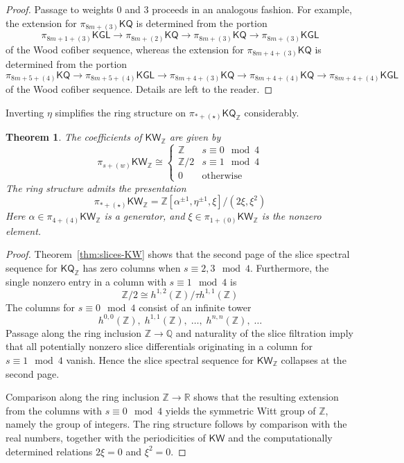 \documentclass[11pt,hyp,english]{article}
\newcommand{\Z}{\mathbb{Z}}
\newcommand{\Q}{\mathbb{Q}}
\newcommand{\KGL}{\mathsf{KGL}}
\newcommand{\KQ}{\mathsf{KQ}}
\newcommand{\KW}{\mathsf{KW}}
\newcommand{\R}{\mathbb{R}}
\newcommand{\bideg}{(\star)}
\newtheorem{theorem}{Theorem}[section]
\theoremstyle{definition}
\begin{document}
\begin{proof}
Passage to weights $0$ and $3$ proceeds in an analogous fashion.  
For example, the extension for $\pi_{8m+(3)}\KQ$ is determined from the portion
\[
  \pi_{8m+1+(3)}\KGL \to \pi_{8m+(2)}\KQ \to \pi_{8m+(3)}\KQ \to \pi_{8m+(3)}\KGL
\]
of the Wood cofiber sequence, whereas the extension for $\pi_{8m+4+(3)}\KQ$ is determined from the portion
\[
  \pi_{8m+5+(4)}\KQ \to \pi_{8m+5+(4)}\KGL \to \pi_{8m+4+(3)}\KQ \to \pi_{8m+4+(4)}\KQ \to \pi_{8m+4+(4)}\KGL
\]
of the Wood cofiber sequence.  
Details are left to the reader.
\end{proof}
    
Inverting $\eta$ simplifies the ring structure on $\pi_{\ast+\bideg}\KQ_\Z$ considerably.

\begin{theorem}\label{thm:coeff-KW}
The coefficients of $\KW_\Z$ are given by 
\[
  \pi_{s+(w)}\KW_\Z \cong
  \begin{cases} 
    \Z & s \equiv 0 \mod{4} \\ 
    \Z/2 & s \equiv 1 \mod{4} \\ 
    0 & \text{otherwise} 
  \end{cases}
\]
The ring structure admits the presentation
\[
  \pi_{\ast+\bideg}\KW_\Z = \Z[\alpha^{\pm 1}, \eta^{\pm 1}, \xi]/(2\xi,\xi^2)
\]
Here $\alpha \in \pi_{4+(4)}\KW_\Z$ is a generator, and $\xi \in \pi_{1+(0)}\KW_\Z$ is the nonzero element.
\end{theorem}

\begin{proof}
Theorem~\ref{thm:slices-KW} shows that the second page of the slice spectral sequence for $\KQ_\Z$ has zero columns when $s \equiv 2,3 \mod{4}$.  
Furthermore, the single nonzero entry in a column with $s \equiv 1 \mod{4}$ is
\[
  \Z/2 \cong h^{1,2}(\Z) / \tau h^{1,1}(\Z)
\]
The columns for $s \equiv 0 \mod{4}$ consist of an infinite tower 
\[
  h^{0,0}(\Z), \; h^{1,1}(\Z), \; \dotsc, \; h^{n,n}(\Z), \; \dotsc
\]
Passage along the ring inclusion $\Z \to \Q$ and naturality of the slice filtration imply that all potentially nonzero slice differentials originating in a column for $s \equiv 1 \mod{4}$ vanish.  
Hence the slice spectral sequence for $\KW_\Z$ collapses at the second page.  

Comparison along the ring inclusion $\Z \to \R$ shows that the resulting extension from the columns with $s \equiv 0 \mod{4}$ yields the symmetric Witt group of $\Z$, namely the group of integers.  
The ring structure follows by comparison with the real numbers, together with the periodicities of $\KW$ and the computationally determined relations $2\xi = 0$ and $\xi^2 = 0$.
\end{proof}



\printbibliography
\end{document}
